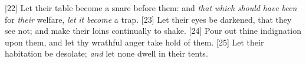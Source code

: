 [22] \textcolor[cmyk]{0.99998,1,0,0}{Let their table become a snare before them: and \emph{that} \emph{which} \emph{should} \emph{have} \emph{been} for \emph{their} welfare, \emph{let} \emph{it} \emph{become} a trap.}
[23] \textcolor[cmyk]{0.99998,1,0,0}{Let their eyes be darkened, that they see not; and make their loins continually to shake.} %
[24] \textcolor[cmyk]{0.99998,1,0,0}{Pour out thine indignation upon them, and let thy wrathful anger take hold of them.}
[25] \textcolor[cmyk]{0.99998,1,0,0}{Let their habitation be desolate; \emph{and} let none dwell in their tents.} %
